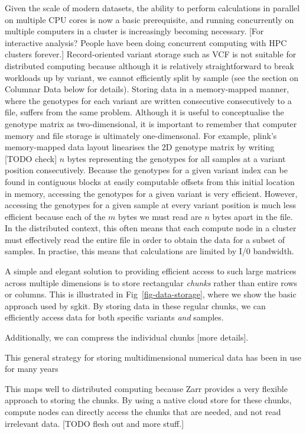 \documentclass[a4paper,num-refs]{oup-contemporary}
\begin{document}
Given the scale of modern datasets, the ability to perform
calculations in parallel on multiple CPU cores
is now a basic prerequisite, and
running concurrently on multiple computers in a cluster
is increasingly becoming necessary. [For interactive analysis? People have
been doing concurrent computing with HPC clusters forever.]
Record-oriented variant storage such as VCF is not suitable
for  distributed computing because although it is relatively
straightforward to break workloads up by variant, we cannot efficiently
split by sample (see the section on Columnar Data below for details).
Storing data in a memory-mapped manner, where the genotypes
for each variant are written consecutive consecutively to a file,
suffers from the same problem. Although it is useful to conceptualise
the genotype matrix as two-dimensional, it is important to remember
that computer memory and file storage is ultimately one-dimensonal.
For example, plink's memory-mapped data layout linearises the 2D
genotype matrix by writing [TODO check] $n$ bytes representing
the genotypes for all samples at a variant position consecutively.
Because the genotypes for a given variant index can be found
in contiguous blocks at easily computable offsets from
this initial location in memory,
accessing the genotypes for a given variant is very efficient.
However, accessing the genotypes for a given sample at every
variant position is much less efficient because each of the $m$ bytes we
must read are $n$ bytes apart in the file.
In the distributed context, this often means
that each compute node  in a
cluster must effectively read the entire file in order to obtain the
data for a subset of samples. In practise, this means that calculations
are limited by I/0 bandwidth.


A simple and elegant solution to providing efficient access to such
large matrices across multiple dimensions is to store rectangular
\emph{chunks} rather than entire rows or columns. This is illustrated
in Fig~\ref{fig-data-storage}, where we show the basic approach
used by sgkit. By storing data in these regular chunks, we
can efficiently access data for both specific variants \emph{and}
samples.

Additionally, we can compress the individual chunks [more details].

This general strategy for storing multidimensional numerical data
has been in use for many years~\citep{folk2011overview}

This maps well to distributed computing because Zarr provides a
very flexible approach to storing the chunks. By using a native cloud store
for these chunks, compute nodes can directly access the chunks that
are needed, and not read irrelevant data.
[TODO flesh out and more stuff.]
\end{document}
